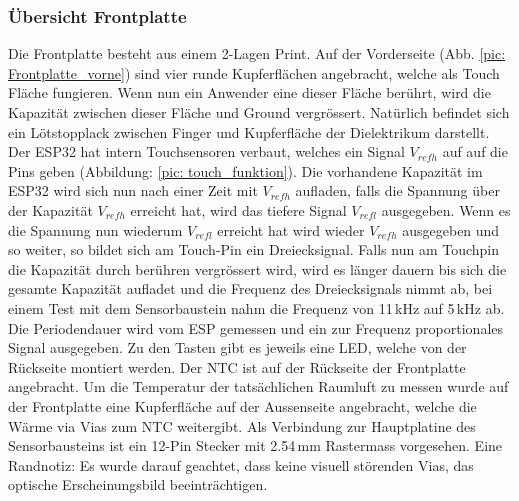 \subsubsection{Übersicht Frontplatte}
Die Frontplatte besteht aus einem 2-Lagen Print. Auf der Vorderseite (Abb. \ref{pic: Frontplatte_vorne}) sind vier runde Kupferflächen angebracht, welche als Touch Fläche fungieren. Wenn nun ein Anwender eine dieser Fläche berührt, wird die Kapazität zwischen dieser Fläche und Ground vergrössert. Natürlich befindet sich ein Lötstopplack zwischen Finger und Kupferfläche der Dielektrikum darstellt. Der ESP32 hat intern Touchsensoren verbaut, welches ein Signal $V_{refh}$ auf auf die Pins geben (Abbildung: \ref{pic: touch_funktion}). Die vorhandene Kapazität im ESP32 wird sich nun nach einer Zeit mit $V_{refh}$ aufladen, falls die Spannung über der Kapazität $V_{refh}$ erreicht hat, wird das tiefere Signal $V_{refl}$ ausgegeben. Wenn es die Spannung nun wiederum $V_{refl}$ erreicht hat wird wieder  $V_{refh}$ ausgegeben und so weiter, so bildet sich am Touch-Pin ein Dreiecksignal. Falls nun am Touchpin die Kapazität durch berühren vergrössert wird, wird es länger dauern bis sich die gesamte Kapazität aufladet und die Frequenz des Dreiecksignals nimmt ab, bei einem Test mit dem Sensorbaustein nahm die Frequenz von 11\,kHz auf 5\,kHz ab. Die Periodendauer wird vom ESP gemessen und ein zur Frequenz proportionales Signal ausgegeben. Zu den Tasten gibt es jeweils eine LED, welche von der Rückseite montiert werden. Der NTC ist auf der Rückseite der Frontplatte angebracht. Um die Temperatur der tatsächlichen Raumluft zu messen wurde auf der Frontplatte eine Kupferfläche auf der Aussenseite angebracht, welche die Wärme via Vias zum NTC weitergibt. Als Verbindung zur Hauptplatine des Sensorbausteins ist ein 12-Pin Stecker mit 2.54\,mm Rastermass vorgesehen. Eine Randnotiz: Es wurde darauf geachtet, dass keine visuell störenden Vias, das optische Erscheinungsbild beeinträchtigen.

